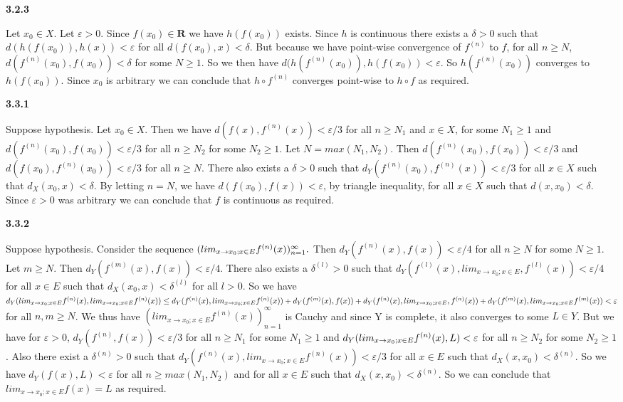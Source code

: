 \documentclass[12pt]{article}
\begin{document}
\textbf{3.2.3}

Let $x_0 \in X$. Let $\varepsilon>0$. Since $f(x_0)\in \textbf{R}$ we have $h(f(x_0))$ exists. Since $h$ is continuous there exists a $\delta >0$ such that $ d(h(f(x_0)),h(x)) < \varepsilon$ for all $d(f(x_0),x) < \delta$. But because we have point-wise convergence of $f^{(n)}$ to $f$, for all $n\geq N$, $d(f^{(n)}(x_0), f(x_0))< \delta$ for some $N\geq 1$. So we then have $d(h(f^{(n)}(x_0)),h(f(x_0)) <\varepsilon$. So $h(f^{(n)}(x_0))$ converges to $h(f(x_0))$. Since $x_0$ is arbitrary we can conclude that $h\circ f^{(n)}$ converges point-wise to $h\circ f$ as required. 

\textbf{3.3.1}

Suppose hypothesis. Let $x_0 \in X$.  Then we have $d(f(x), f^{(n)}(x)) < \varepsilon/3$ for all $n\geq N_1$ and $x\in X$, for some $N_1\geq 1$ and $d(f^{(n)}(x_0), f(x_0)) < \varepsilon/3$ for all $n\geq N_2$ for some $N_2\geq 1$. Let $N = max(N_1, N_2)$. Then $d(f^{(n)}(x_0), f(x_0))< \varepsilon/3$ and $d(f(x_0), f^{(n)}(x_0)) < \varepsilon/3$ for all $n\geq N$. There also exists a $\delta>0$ such that $d_Y(f^{(n)}(x_0),f^{(n)}(x)) < \varepsilon/3 $ for all $x\in X$ such that $d_X(x_0,x) <\delta$. By letting $n=N$, we have $d(f(x_0), f(x)) <\varepsilon$, by triangle inequality, for all $x\in X$ such that $d(x,x_0)< \delta$. Since $\varepsilon>0$ was arbitrary we can conclude that $f$ is continuous as required.

\textbf{3.3.2}

Suppose hypothesis. Consider the sequence $(lim_{x\to x_0;x\in E}f^{(n)}(x))_{n=1}^\infty.\\$ Then $d_Y(f^{(n)}(x), f(x)) < \varepsilon/4$ for all $n\geq N$ for some $N\geq 1$. Let $m\geq N$. Then $d_Y(f^{(m)}(x), f(x)) < \varepsilon/4$. There also exists a $\delta^{(l)}>0$ such that $d_Y(f^{(l)}(x),lim_{x\to x_0;x\in E},f^{(l)}(x))< \varepsilon/4$ for all $x\in E$ such that $d_X(x_0,x) < \delta^{(l)}$ for all $l>0$. So we have $d_Y(lim_{x\to x_0;x\in E}f^{(n)}(x),lim_{x\to x_0;x\in E}f^{(n)}(x))\leq d_Y(f^{(n)}(x),lim_{x\to x_0;x\in E}f^{(n)}(x)) +d_Y(f^{(m)}(x), f(x))\\+ d_Y(f^{(n)}(x),lim_{x\to x_0;x\in E},f^{(n)}(x)) + d_Y(f^{(m)}(x),lim_{x\to x_0;x\in E}f^{(m)}(x))< \varepsilon$ for all $n,m \geq N$. We thus have $(lim_{x\to x_0;x\in E}f^{(n)}(x))_{n=1}^\infty$ is Cauchy and since Y is complete, it also converges to some $L\in Y$. But we have for $\varepsilon>0$, $d_Y(f^{(n)},f(x)) <\varepsilon/3$ for all $n\geq N_1$ for some $N_1\geq 1$ and $\\ d_Y(lim_{x\to x_0;x\in E}f^{(n)}(x),L) < \varepsilon$ for all $n\geq N_2$ for some $N_2\geq 1$. Also there exist a $\delta^{(n)}>0$ such that $ d_Y(f^{(n)}(x), lim_{x\to x_0;x\in E}f^{(n)}(x))< \varepsilon/3$ for all $x\in E$ such that $d_X(x,x_0) < \delta^{(n)}$. So we have $d_Y(f(x),L)< \varepsilon$ for all $n\geq max(N_1,N_2)$ and for all $x\in E$ such that $d_X(x,x_0)< \delta ^{(n)}$. So we can conclude that $lim_{x\to x_0;x\in E}f(x) = L$ as required.
\end{document}
